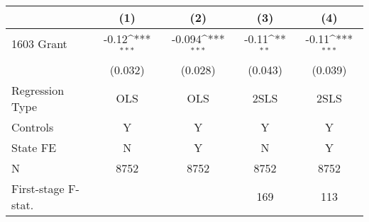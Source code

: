 {
\def\sym#1{\ifmmode^{#1}\else\(^{#1}\)\fi}
\begin{tabular}{l*{4}{c}}
\toprule
                &\multicolumn{1}{c}{(1)}         &\multicolumn{1}{c}{(2)}         &\multicolumn{1}{c}{(3)}         &\multicolumn{1}{c}{(4)}         \\
\midrule
1603 Grant      &    -0.12\sym{***}&   -0.094\sym{***}&    -0.11\sym{**} &    -0.11\sym{***}\\
                &  (0.032)         &  (0.028)         &  (0.043)         &  (0.039)         \\
\midrule
Regression Type &      OLS         &      OLS         &     2SLS         &     2SLS         \\
Controls        &        Y         &        Y         &        Y         &        Y         \\
State FE        &        N         &        Y         &        N         &        Y         \\
N               &     8752         &     8752         &     8752         &     8752         \\
First-stage F-stat.&                  &                  &      169         &      113         \\
\bottomrule
\end{tabular}
}

